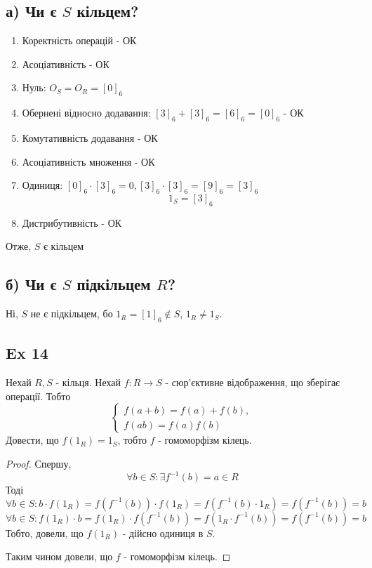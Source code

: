 \documentclass[11pt, a4paper]{article} %
\begin{document}
\subsection*{а) Чи є $S$ кільцем?}
\begin{enumerate}
    \item Коректність операцій - ОК
    \item Асоціативність - ОК
    \item Нуль: $O_S = O_R = [0]_6$
    \item Обернені відносно додавання: $[3]_6+[3]_6=[6]_6=[0]_6$ - ОК
    \item Комутативність додавання - ОК
    \item Асоціативність множення - ОК
    \item Одиниця: $[0]_6\cdot [3]_6 = 0, [3]_6\cdot [3]_6 = [9]_6 = [3]_6$
    \[1_S = [3]_6\]
    \item Дистрибутивність - ОК
\end{enumerate}
Отже, $S$ є кільцем

\subsection*{б) Чи є $S$ підкільцем $R$?}
Ні, $S$ не є підкільцем, бо $1_R = [1]_6 \notin S$, $1_R \ne 1_S$.


\subsection*{Ex 14}
\begin{mdframed}
    Нехай $R,S$ - кільця. Нехай $f: R \to S$ - сюр'єктивне відображення, що зберігає операції.
    Тобто
    \[\begin{cases}
        f(a+b) = f(a) + f(b),\\
        f(ab) = f(a)f(b)
    \end{cases}\]
    Довести, що $f(1_R)=1_S$, тобто $f$ - гомоморфізм кілець.
\end{mdframed}
\begin{proof}
    Спершу,
    \[\forall b \in S: \exists f^{-1}(b)=a \in R\]
    Тоді 
    \[\forall b\in S: b\cdot f(1_R) = f(f^{-1}(b))\cdot f(1_R) = f(f^{-1}(b) \cdot 1_R) = f(f^{-1}(b)) = b  \]
    \[\forall b\in S: f(1_R)\cdot b = f(1_R)\cdot f(f^{-1}(b))  = f(1_R \cdot f^{-1}(b)) = f(f^{-1}(b)) = b  \]
    Тобто, довели, що $f(1_R)$ - дійсно одиниця в $S$. 

    Таким чином довели, що $f$ - гомоморфізм кілець.
\end{proof}
\end{document}
